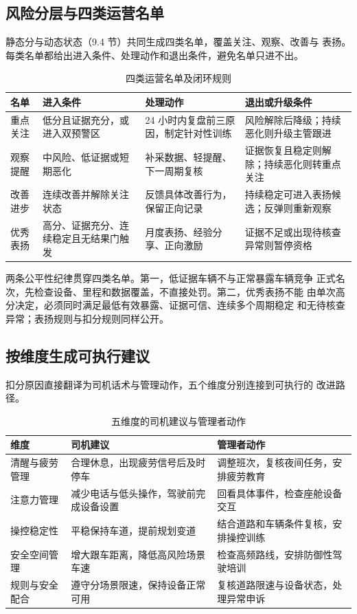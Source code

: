 \subsection{风险分层与四类运营名单}

静态分与动态状态（9.4 节）共同生成四类名单，覆盖关注、观察、改善与
表扬。每类名单都给出进入条件、处理动作和退出条件，避免名单只进不出。

\begin{table}[H]
\centering
\caption{四类运营名单及闭环规则}
\label{tab:t2-lists}
\small
\begin{tabularx}{\textwidth}{lLLL}
\toprule
名单 & 进入条件 & 处理动作 & 退出或升级条件 \\
\midrule
重点关注 & 低分且证据充分，或进入双预警区 & 24 小时内复盘前三原因，制定针对性训练 & 风险解除后降级；持续恶化则升级主管跟进 \\
观察提醒 & 中风险、低证据或短期恶化 & 补采数据、轻提醒、下一周期复核 & 证据恢复且稳定则解除；持续恶化则转重点关注 \\
改善进步 & 连续改善并解除关注状态 & 反馈具体改善行为，保留正向记录 & 持续稳定可进入表扬候选；反弹则重新观察 \\
优秀表扬 & 高分、证据充分、连续稳定且无结果门触发 & 月度表扬、经验分享、正向激励 & 证据不足或出现待核查异常则暂停资格 \\
\bottomrule
\end{tabularx}
\end{table}

两条公平性纪律贯穿四类名单。第一，低证据车辆不与正常暴露车辆竞争
正式名次，先检查设备、里程和数据覆盖，不直接处罚。第二，优秀表扬不能
由单次高分决定，必须同时满足最低有效暴露、证据可信、连续多个周期稳定
和无待核查异常；表扬规则与扣分规则同样公开。

\subsection{按维度生成可执行建议}

扣分原因直接翻译为司机话术与管理动作，五个维度分别连接到可执行的
改进路径。

\begin{table}[H]
\centering
\caption{五维度的司机建议与管理者动作}
\label{tab:t2-actions}
\small
\begin{tabularx}{\textwidth}{lLL}
\toprule
维度 & 司机建议 & 管理者动作 \\
\midrule
清醒与疲劳管理 & 合理休息，出现疲劳信号后及时停车 & 调整班次，复核夜间任务，安排疲劳教育 \\
注意力管理 & 减少电话与低头操作，驾驶前完成设备设置 & 回看具体事件，检查座舱设备交互 \\
操控稳定性 & 平稳保持车道，提前规划变道 & 结合道路和车辆条件复核，安排操控训练 \\
安全空间管理 & 增大跟车距离，降低高风险场景车速 & 检查高频路线，安排防御性驾驶培训 \\
规则与安全配合 & 遵守分场景限速，保持设备正常可用 & 复核道路限速与设备状态，处理异常申诉 \\
\bottomrule
\end{tabularx}
\end{table}

